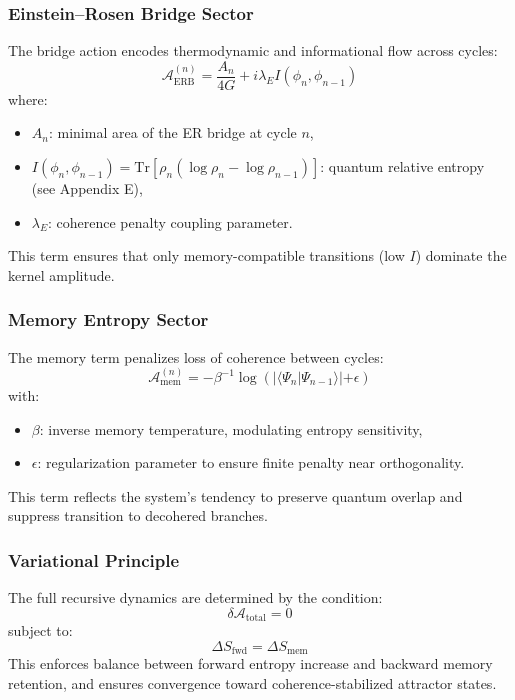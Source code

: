 \subsubsection*{Einstein–Rosen Bridge Sector}

The bridge action encodes thermodynamic and informational flow across cycles:
\begin{equation}
\mathcal{A}_{\text{ERB}}^{(n)} = \frac{A_n}{4G} + i\lambda_E I(\phi_n, \phi_{n-1})
\end{equation}
where:
\begin{itemize}
  \item \( A_n \): minimal area of the ER bridge at cycle \( n \),
  \item \( I(\phi_n, \phi_{n-1}) = \mathrm{Tr}\left[ \rho_n (\log \rho_n - \log \rho_{n-1}) \right] \): quantum relative entropy (see Appendix E),
  \item \( \lambda_E \): coherence penalty coupling parameter.
\end{itemize}

This term ensures that only memory-compatible transitions (low \( I \)) dominate the kernel amplitude.

\subsubsection*{Memory Entropy Sector}

The memory term penalizes loss of coherence between cycles:
\begin{equation}
\mathcal{A}_{\text{mem}}^{(n)} = -\beta^{-1} \log \left( |\langle \Psi_n | \Psi_{n-1} \rangle| + \epsilon \right)
\end{equation}
with:
\begin{itemize}
  \item \( \beta \): inverse memory temperature, modulating entropy sensitivity,
  \item \( \epsilon \): regularization parameter to ensure finite penalty near orthogonality.
\end{itemize}

This term reflects the system’s tendency to preserve quantum overlap and suppress transition to decohered branches.

\subsubsection*{Variational Principle}

The full recursive dynamics are determined by the condition:
\begin{equation}
\delta \mathcal{A}_{\text{total}} = 0
\end{equation}
subject to:
\begin{equation}
\Delta S_{\text{fwd}} = \Delta S_{\text{mem}}
\end{equation}
This enforces balance between forward entropy increase and backward memory retention, and ensures convergence toward coherence-stabilized attractor states.

